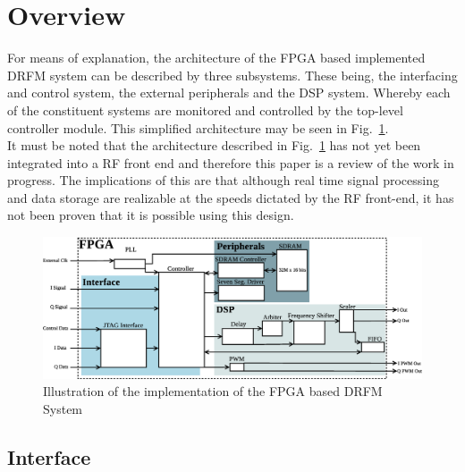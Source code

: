 \section{Overview} \label{sec:design}
	\noindent For means of explanation, the architecture of the FPGA based implemented DRFM system can be described by three subsystems. These being, the interfacing and control system, the external peripherals and the DSP system. Whereby each of the constituent systems are monitored and controlled by the top-level controller module. This simplified architecture may be seen in Fig.~\ref{fig:DRFM_Architecture}.\\ \newline It must be noted that the architecture described in Fig.~\ref{fig:DRFM_Architecture} has not yet been integrated into a RF front end and therefore this paper is a review of the work in progress. The implications of this are that although real time signal processing and data storage are realizable at the speeds dictated by the RF front-end, it has not been proven that it is possible using this design. 
	\begin{figure}[h!]
		\centering
		\includegraphics[width=0.95\linewidth]{img/System_Overview}
		\caption{Illustration of the implementation of the  FPGA based DRFM System}
		\label{fig:DRFM_Architecture}
	\end{figure}
	
	\subsection{Interface}
